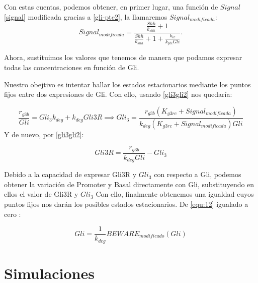 Con estas cuentas, podemos obtener, en primer lugar, una función de $Signal$\ref{signal} modificada gracias a \ref{gli-ptc2}, la llamaremos $Signal_{modificada}$:
\begin{equation}
Signal_{modificada}=\frac{\frac{Shh}{k_{shh}} + 1}{\frac{Shh}{k_{shh}} + 1 + \frac{k_{cc}}{k_{ptc}Gli}}.
\end{equation}

Ahora, sustituimos los valores que tenemos de manera que podamos expresar todas las concentraciones en función de Gli. 

Nuestro obejtivo es intentar hallar los estados estacionarios mediante los puntos fijos entre dos expresiones de Gli. Con ello, usando \ref{gli3gli2} nos quedaría:

\begin{equation}
\frac{r_{g3b}}{Gli}=Gli_3k_{deg}+k_{deg}Gli3R
\implies Gli_3=\frac{r_{g3b}(K_{g3rc}+Signal_{modificada})}{k_{deg}(K_{g3rc}+Signal_{modificada})Gli}
\label{equgli32}
\end{equation}
Y de nuevo, por  \ref{gli3gli2}:

\begin{equation}
Gli3R=\frac{r_{g3b}}{k_{deg}Gli}-Gli_3
\label{equgli3r2}
\end{equation}

Debido a la capacidad de expresar Gli3R y $Gli_3$ con respecto a Gli, podemos obtener la variación de Promoter y Basal directamente con Gli, substituyendo en ellos el valor de Gli3R y $Gli_3$
Con ello, finalmente obtenemos una igualdad cuyos puntos fijos nos darán los posibles estados estacionarios. De \ref{equ:12} igualado a cero :

\begin{equation}
Gli=\frac{1}{k_{deg}}BEWARE_{modificado}(Gli)
\label{final_gli12}
\end{equation}


\section{Simulaciones}
